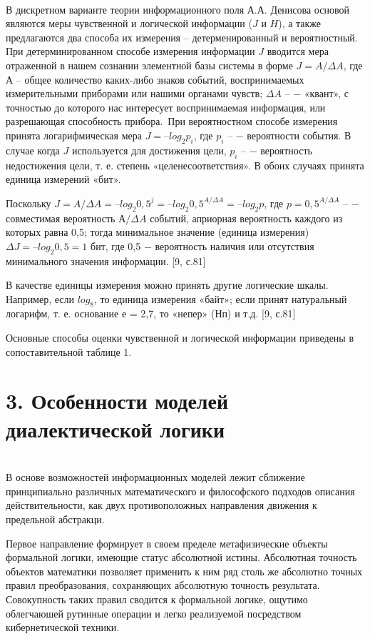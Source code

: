 \documentclass[a4paper,12pt]{report}
\begin{document}
\\
В дискретном варианте теории информационного поля А.А. Денисова основой являются меры чувственной и логической информации ($J$ и $H$), а также предлагаются два способа их измерения – детерменированный и вероятностный. При детерминированном способе измерения информации $J$ вводится мера отраженной в нашем сознании элементной базы системы в форме $J = A/\Delta A$, где $А$ – общее количество каких-либо
знаков событий, воспринимаемых измерительными приборами или нашими органами чувств; $\Delta A \mbox{ –}$ − «квант», с точностью
до которого нас интересует воспринимаемая информация, или
разрешающая способность прибора.\ При вероятностном способе измерения принята логарифмическая мера $J = –log_2 p_i$, где $p_i \mbox{ –}$ − вероятности события. В случае когда $J$ используется для достижения цели, $p_i \mbox{ –}$ − вероятность недостижения цели, т. е. степень «целенесоответствия».
В обоих случаях принята единица измерений «бит».

 Поскольку
$J = A/\Delta A = –log_2 0,5^j = –log_2 0,5^{A/\Delta A} = –log_2p$, где $p = 0,5^{A/\Delta A} \mbox{ –}$ − совместимая вероятность $А/\Delta A$ событий, априорная вероятность каждого из которых равна 0,5; тогда минимальное значение (единица измерения) $\Delta J = –log_2 0,5 = 1 \mbox{ бит}$, где 0,5 − вероятность наличия или отсутствия минимального значения информации. [9, с.81]

В качестве единицы измерения можно принять другие логические шкалы. Например, если $log_8$, то единица измерения «байт»; если
принят натуральный логарифм, т. е. основание е = 2,7, то «непер»
(Нп) и т.д. [9, с.81]

Основные способы оценки чувственной и логической информации приведены в сопоставительной таблице 1.\\
	
	


\chapter*{3. Особенности моделей диалектической логики }
 \\

В основе возможностей информационных моделей лежит сближение  принципиально различных математического и философского подходов описания действительности, как двух противоположных направления движения к предельной абстракци.

Первое направление формирует в своем пределе метафизические объекты формальной логики, имеющие статус абсолютной истины. Абсолютная точность объектов математики позволяет применить к ним ряд столь же абсолютно точных правил преобразования, сохраняющих абсолютную точность результата. Совокупность таких правил сводится к формальной логике, ощутимо облегчаюшей рутинные операции и легко реализуемой посредством кибернетической техники.
\end{document}
